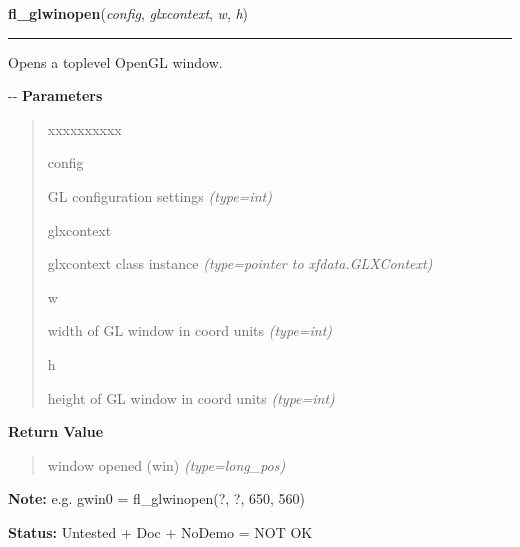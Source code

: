     \label{xformslib:flglcanvas:fl_glwinopen}

    \vspace{0.5ex}

\hspace{.8\funcindent}\begin{boxedminipage}{\funcwidth}

    \raggedright \textbf{fl\_glwinopen}(\textit{config}, \textit{glxcontext}, \textit{w}, \textit{h})

    \vspace{-1.5ex}

    \rule{\textwidth}{0.5\fboxrule}
\setlength{\parskip}{2ex}

Opens a toplevel OpenGL window.

-{}-
\setlength{\parskip}{1ex}
      \textbf{Parameters}
      \vspace{-1ex}

      \begin{quote}
        \begin{Ventry}{xxxxxxxxxx}

          \item[config]


GL configuration settings
            {\it (type=int)}

          \item[glxcontext]


glxcontext class instance
            {\it (type=pointer to xfdata.GLXContext)}

          \item[w]


width of GL window in coord units
            {\it (type=int)}

          \item[h]


height of GL window in coord units
            {\it (type=int)}

        \end{Ventry}

      \end{quote}

      \textbf{Return Value}
    \vspace{-1ex}

      \begin{quote}

window opened (win)
      {\it (type=long\_pos)}

      \end{quote}

\textbf{Note:} 
e.g. gwin0 = fl\_glwinopen(?, ?, 650, 560)


\textbf{Status:} 
Untested + Doc + NoDemo = NOT OK


    \end{boxedminipage}


